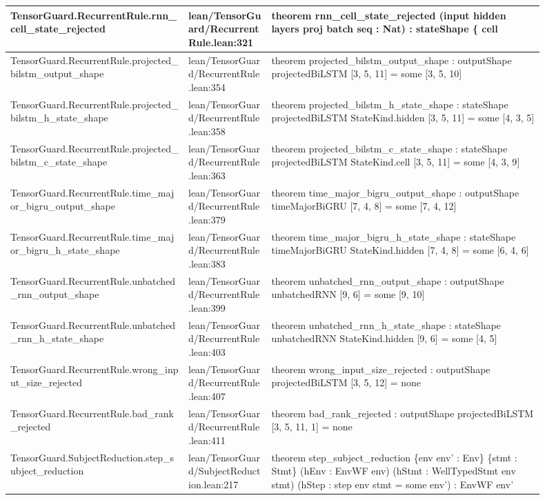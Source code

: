 \documentclass[10pt]{article}
\begin{document}
\begin{longtable}{|p{0.30\linewidth}|p{0.14\linewidth}|p{0.46\linewidth}|}
\hline
TensorGuard.RecurrentRule.rnn\_cell\_state\_rejected & lean/TensorGuard/RecurrentRule.lean:321 & theorem rnn\_cell\_state\_rejected (input hidden layers proj batch seq : Nat) : stateShape \{ cell \\
\hline
TensorGuard.RecurrentRule.projected\_bilstm\_output\_shape & lean/TensorGuard/RecurrentRule.lean:354 & theorem projected\_bilstm\_output\_shape : outputShape projectedBiLSTM [3, 5, 11] = some [3, 5, 10] \\
\hline
TensorGuard.RecurrentRule.projected\_bilstm\_h\_state\_shape & lean/TensorGuard/RecurrentRule.lean:358 & theorem projected\_bilstm\_h\_state\_shape : stateShape projectedBiLSTM StateKind.hidden [3, 5, 11] = some [4, 3, 5] \\
\hline
TensorGuard.RecurrentRule.projected\_bilstm\_c\_state\_shape & lean/TensorGuard/RecurrentRule.lean:363 & theorem projected\_bilstm\_c\_state\_shape : stateShape projectedBiLSTM StateKind.cell [3, 5, 11] = some [4, 3, 9] \\
\hline
TensorGuard.RecurrentRule.time\_major\_bigru\_output\_shape & lean/TensorGuard/RecurrentRule.lean:379 & theorem time\_major\_bigru\_output\_shape : outputShape timeMajorBiGRU [7, 4, 8] = some [7, 4, 12] \\
\hline
TensorGuard.RecurrentRule.time\_major\_bigru\_h\_state\_shape & lean/TensorGuard/RecurrentRule.lean:383 & theorem time\_major\_bigru\_h\_state\_shape : stateShape timeMajorBiGRU StateKind.hidden [7, 4, 8] = some [6, 4, 6] \\
\hline
TensorGuard.RecurrentRule.unbatched\_rnn\_output\_shape & lean/TensorGuard/RecurrentRule.lean:399 & theorem unbatched\_rnn\_output\_shape : outputShape unbatchedRNN [9, 6] = some [9, 10] \\
\hline
TensorGuard.RecurrentRule.unbatched\_rnn\_h\_state\_shape & lean/TensorGuard/RecurrentRule.lean:403 & theorem unbatched\_rnn\_h\_state\_shape : stateShape unbatchedRNN StateKind.hidden [9, 6] = some [4, 5] \\
\hline
TensorGuard.RecurrentRule.wrong\_input\_size\_rejected & lean/TensorGuard/RecurrentRule.lean:407 & theorem wrong\_input\_size\_rejected : outputShape projectedBiLSTM [3, 5, 12] = none \\
\hline
TensorGuard.RecurrentRule.bad\_rank\_rejected & lean/TensorGuard/RecurrentRule.lean:411 & theorem bad\_rank\_rejected : outputShape projectedBiLSTM [3, 5, 11, 1] = none \\
\hline
TensorGuard.SubjectReduction.step\_subject\_reduction & lean/TensorGuard/SubjectReduction.lean:217 & theorem step\_subject\_reduction \{env env' : Env\} \{stmt : Stmt\} (hEnv : EnvWF env) (hStmt : WellTypedStmt env stmt) (hStep : step env stmt = some env') : EnvWF env' \\

\end{longtable}
\end{document}
